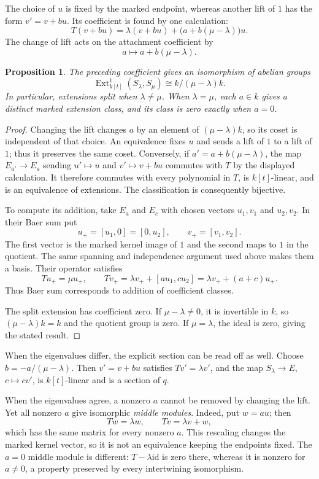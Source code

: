 \documentclass[11pt]{article}
\newtheorem{proposition}[theorem]{Proposition}
\theoremstyle{definition}
\theoremstyle{remark}\newtheorem{remark}[theorem]{Remark}
\newcommand{\id}{\mathrm{id}}
\DeclareMathOperator{\Ext}{Ext}
\begin{document}
The choice of $u$ is fixed by the marked endpoint, whereas another lift
of $1$ has the form $v'=v+bu$. Its coefficient is found by one calculation:
\[
T(v+bu)=\lambda(v+bu)+\bigl(a+b(\mu-\lambda)\bigr)u.
\]
The change of lift acts on the attachment coefficient by
\[
a\longmapsto a+b(\mu-\lambda).
\]

\begin{proposition}\label{x:operator-ext-classification}
The preceding coefficient gives an isomorphism of abelian groups
\[
\Ext^1_{k[t]}(S_\lambda,S_\mu)
 \cong k/(\mu-\lambda)k.
\]
In particular, extensions split when $\lambda\ne\mu$. When
$\lambda=\mu$, each $a\in k$ gives a distinct marked extension class,
and its class is zero exactly when $a=0$.
\end{proposition}
\begin{proof}
Changing the lift changes $a$ by an element of $(\mu-\lambda)k$, so
its coset is independent of that choice. An equivalence fixes $u$ and
sends a lift of $1$ to a lift of $1$; thus it preserves the same coset.
Conversely, if $a'=a+b(\mu-\lambda)$, the map $E_{a'}\to E_a$ sending
$u'\mapsto u$ and $v'\mapsto v+bu$ commutes with $T$ by the displayed
calculation. It therefore commutes with every polynomial in $T$, is
$k[t]$-linear, and is an equivalence of extensions. The classification
is consequently bijective.

To compute its addition, take $E_a$ and $E_c$ with chosen vectors
$u_1,v_1$ and $u_2,v_2$. In their Baer sum put
\[
u_+=[u_1,0]=[0,u_2],\qquad v_+=[v_1,v_2].
\]
The first vector is the marked kernel image of $1$ and the second maps
to $1$ in the quotient. The same spanning and independence argument
used above makes them a basis. Their operator satisfies
\[
Tu_+=\mu u_+,\qquad
Tv_+=\lambda v_++[a u_1,c u_2]
       =\lambda v_++(a+c)u_+.
\]
Thus Baer sum corresponds to addition of coefficient classes.

The split extension has coefficient zero. If $\mu-\lambda\ne0$, it
is invertible in $k$, so $(\mu-\lambda)k=k$ and the quotient group is
zero. If $\mu=\lambda$, the ideal is zero, giving the stated result.
\end{proof}

When the eigenvalues differ, the explicit section can be read off as
well. Choose $b=-a/(\mu-\lambda)$. Then $v'=v+bu$ satisfies
$Tv'=\lambda v'$, and the map $S_\lambda\to E$, $c\mapsto cv'$, is
$k[t]$-linear and is a section of $q$.

When the eigenvalues agree, a nonzero $a$ cannot be removed by changing
the lift. Yet all nonzero $a$ give isomorphic \emph{middle modules}.
Indeed, put $w=au$; then
\[
Tw=\lambda w,\qquad Tv=\lambda v+w,
\]
which has the same matrix for every nonzero $a$. This rescaling changes
the marked kernel vector, so it is not an equivalence keeping the
endpoints fixed. The $a=0$ middle module is different: $T-\lambda\id$
is zero there, whereas it is nonzero for $a\ne0$, a property preserved
by every intertwining isomorphism.
\end{document}
